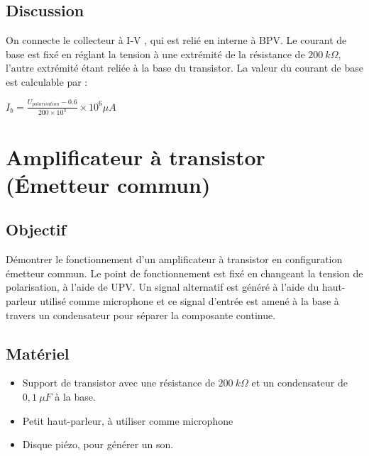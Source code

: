 \documentclass{book}
\begin{document}
\subsection{Discussion}


On connecte le collecteur à I-V , qui est relié en interne à BPV. Le courant de base est fixé en réglant la tension à une extrémité de la résistance de $200\ k\Omega$, l'autre extrémité étant reliée à la base du transistor. La valeur du courant de base est calculable par :



$I_{b}=\frac{U_{polarisation}-0.6}{200\times10^{3} }\times10^{6}\mu A$







\section{Amplificateur à transistor (Émetteur commun)}



\subsection{Objectif}


Démontrer le fonctionnement d'un amplificateur à transistor en configuration émetteur commun. Le point de fonctionnement est fixé en changeant la tension de polarisation, à l'aide de UPV. Un signal alternatif est généré à l'aide du haut-parleur utilisé comme microphone et ce signal d'entrée est amené à la base à travers un condensateur pour séparer la composante continue.




\subsection{Matériel}


\begin{itemize}
  \item Support de transistor avec une résistance de $200\ k\Omega$   et un condensateur de $0,1\ \mu F$ à la base.
  \item Petit haut-parleur, à utiliser comme microphone
  \item Disque piézo, pour générer un son.
\end{itemize}
\end{document}
